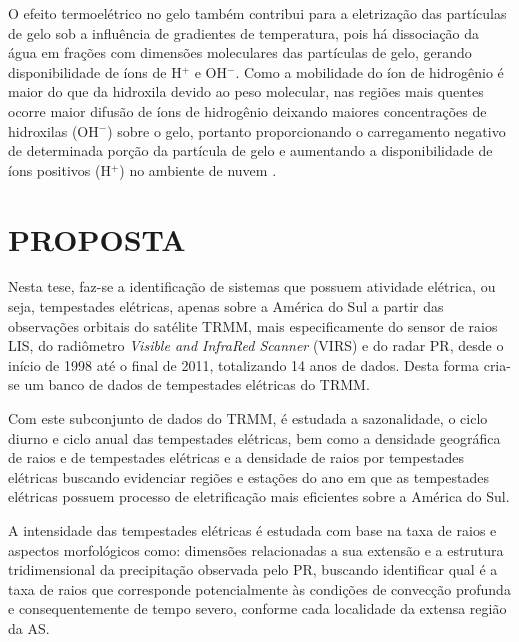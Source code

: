 O efeito termoelétrico no gelo também contribui para a eletrização das partículas de gelo sob a influência de gradientes de temperatura, pois há dissociação da água em frações com dimensões moleculares das partículas de gelo, gerando disponibilidade de íons de H$^{+}$ e OH$^{-}$. Como a mobilidade do íon de hidrogênio é maior do que da hidroxila devido ao peso molecular, nas regiões mais quentes ocorre maior difusão de íons de hidrogênio deixando maiores concentrações de hidroxilas (OH$^{-}$) sobre o gelo, portanto proporcionando o carregamento negativo de determinada porção da partícula de gelo e aumentando a disponibilidade de íons positivos (H$^{+}$) no ambiente de nuvem \cite{latham1961}.  

\section{PROPOSTA}



Nesta tese, faz-se a identificação de sistemas que possuem atividade elétrica, ou seja, tempestades elétricas, apenas sobre a América do Sul a partir das observações orbitais do satélite TRMM, mais especificamente do sensor de raios LIS, do radiômetro \textit{Visible and InfraRed Scanner} (VIRS) e do radar PR, desde o início de 1998 até o final de 2011, totalizando 14 anos de dados. Desta forma cria-se um banco de dados de tempestades elétricas do TRMM.

Com este subconjunto de dados do TRMM, é estudada a sazonalidade, o ciclo diurno e ciclo anual das tempestades elétricas, bem como a densidade geográfica de raios e de tempestades elétricas e a densidade de raios por tempestades elétricas buscando evidenciar regiões e estações do ano em que as tempestades elétricas possuem processo de eletrificação mais eficientes sobre a América do Sul.

A intensidade das tempestades elétricas é estudada com base na taxa de raios e aspectos morfológicos como: dimensões relacionadas a sua extensão e a estrutura tridimensional da precipitação observada pelo PR, buscando identificar qual é a taxa de raios que corresponde potencialmente às condições de convecção profunda e consequentemente de tempo severo, conforme cada localidade da extensa região da AS.

 
